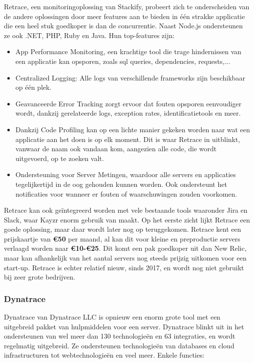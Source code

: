 Retrace, een monitoringoplossing van Stackify, probeert zich te onderscheiden van de andere oplossingen door meer features aan te bieden in één strakke applicatie die een heel stuk goedkoper is dan de concurrentie. Naast Node.js ondersteunen ze ook .NET, PHP, Ruby en Java. Hun top-features zijn:

\begin{itemize}
	\item App Performance Monitoring, een krachtige tool die trage hindernissen van een applicatie kan opsporen, zoals sql queries, dependencies, requests,...
	\item Centralized Logging: Alle logs van verschillende frameworks zijn beschikbaar op één plek.
	\item Geavanceerde Error Tracking zorgt ervoor dat fouten opsporen eenvoudiger wordt, dankzij gerelateerde logs, exception rates, identificatietools en meer.
	\item Dankzij Code Profiling kan op een lichte manier gekeken worden naar wat een applicatie aan het doen is op elk moment. Dit is waar Retrace in uitblinkt, vanwaar de naam ook vandaan kom, aangezien alle code, die wordt uitgevoerd, op te zoeken valt.
	\item Ondersteuning voor Server Metingen, waardoor alle servers en applicaties tegelijkertijd in de oog gehouden kunnen worden. Ook ondersteunt het notificaties voor wanneer er fouten of waarschuwingen zouden voorkomen.
\end{itemize}

Retrace kan ook geïntegreerd worden met vele bestaande tools waaronder Jira en Slack, waar Kayzr enorm gebruik van maakt. Op het eerste zicht lijkt Retrace een goede oplossing, maar daar wordt later nog op teruggekomen. Retrace kent een prijskaartje van \textbf{\euro50} per maand, al kan dit voor kleine en preproductie servers verlaagd worden naar \textbf{\euro10-\euro25}. Dit komt een pak goedkoper uit dan New Relic, maar kan afhankelijk van het aantal servers nog steeds prijzig uitkomen voor een start-up. Retrace is echter relatief nieuw, sinds 2017, en wordt nog niet gebruikt bij zeer grote bedrijven.

\subsubsection{Dynatrace}
\label{sec:dynatrace}

Dynatrace van Dynatrace LLC is opnieuw een enorm grote tool met een uitgebreid pakket van hulpmiddelen voor een server. Dynatrace blinkt uit in het ondersteunen van wel meer dan 130 technologieën en 63 integraties, en wordt regelmatig uitgebreid. Ze ondersteunen technologieën van databases en cloud infrastructuren tot webtechnologieën en veel meer. Enkele functies:

